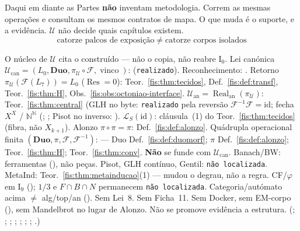 \documentclass[livro.tex]{subfiles}
\begin{document}
\noindent Daqui em diante as Partes \textbf{não} inventam
metodologia. Correm as mesmas operações e consultam os mesmos contratos
de mapa. O que muda é o suporte, e a evidência. \(\mathcal{U}\) não decide
quais capítulos existem.
\[
\boxed{\;
\text{catorze palcos de exposição}
\;\neq\;
\text{catorze corpos isolados}
\;}
\]

\begin{observacao}\label{fis:obs:U-consome}
O núcleo de \(\mathcal{U}\) cita o construído --- não o copia, não
reabre \(\mathrm{I}_{0}\).
Lei canónica
\(\mathcal{U}_{\mathrm{can}}=(L_0,\mathbf{Duo},\pi_{\mathcal{U}}\circ\mathcal{F},\operatorname{vinco})\):
 (\texttt{realizado}).
Reconhecimento: .
Retorno \(\pi_{\mathcal{U}}(\mathcal{F}(L_7))=L_0\)
(\(\operatorname{Res}=0\)): Teor.~\ref{fis:thm:tecidos},
Def.~\ref{fis:def:transf}, Teor.~\ref{fis:thm:H},
Obs.~\ref{fis:obs:octoniao-interface}.
\(\mathcal{U}_{\mathrm{an}}=\operatorname{Real}_{\mathrm{an}}(\pi_{\mathcal{U}})\):
Teor.~\ref{fis:thm:central}
(GLH no byte: \texttt{realizado} pela reversão
\(\mathcal{F}^{-1}\mathcal{F}=\mathrm{id}\);
fecha \(X^{X}\) / \(\mathbb{N}^{\mathbb{N}}\)
(; ;
Pisot no inverso: ).
\(\mathcal{L}_S(\mathrm{id})\): cláusula~(1) do Teor.~\ref{fis:thm:tecidos}
(fibra, não \(X_{k+1}\)).
Alonzo \(\pi\circ\pi=\pi\): Def.~\ref{fis:def:alonzo}.
Quádrupla operacional finita
\((\mathbf{Duo},\pi,\mathcal{F},\mathcal{F}^{-1})\):
--- Duo Def.~\ref{fis:def:duomorf};
\(\pi\) Def.~\ref{fis:def:alonzo};
Teor.~\ref{fis:thm:H}; Teor.~\ref{fis:thm:conv}.
\textbf{Não} se funde com \(\mathcal{U}_{\mathrm{can}}\).
Banach/BW: ferramentas (),
não peças. Pisot, GLH contínuo, Gentil:
\texttt{não localizada}.
MetaInd: Teor.~\ref{fis:thm:metainducao}(1) --- mudou o degrau, não a
regra. CF/\(\varphi\) em \(\mathrm{I}_{9}\)
(); \(1/3\) e
\(F\cap B\cap N\) permanecem \texttt{não localizada}.
Categoria/autómato acima \(\neq\) alg/top/an
(). Sem Lei~8. Sem Ficha~11. Sem Docker, sem
EM-corpo (), sem Mandelbrot no lugar de
Alonzo. Não se promove evidência a estrutura.
(; ;
; ;
; ;
;
.)
\end{observacao}
\end{document}
